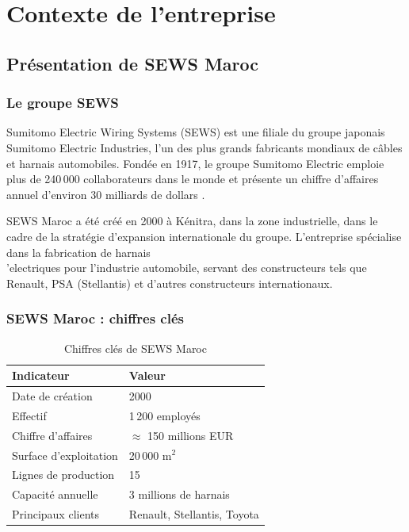 \chapter{Contexte de l'entreprise}

\section{Pr\'esentation de SEWS Maroc}

\subsection{Le groupe SEWS}

Sumitomo Electric Wiring Systems (SEWS) est une filiale du groupe japonais Sumitomo Electric Industries, l'un des plus grands fabricants mondiaux de c\^ables et harnais automobiles. Fond\'ee en 1917, le groupe Sumitomo Electric emploie plus de 240\,000 collaborateurs dans le monde et pr\'esente un chiffre d'affaires annuel d'environ 30 milliards de dollars \cite{sews2024}.

SEWS Maroc a \'et\'e cr\'e\'e en 2000 \`a K\'enitra, dans la zone industrielle, dans le cadre de la strat\'egie d'expansion internationale du groupe. L'entreprise sp\'ecialise dans la fabrication de harnais \\'electriques pour l'industrie automobile, servant des constructeurs tels que Renault, PSA (Stellantis) et d'autres constructeurs internationaux.

\subsection{SEWS Maroc : chiffres cl\'es}

\begin{table}[htbp]
\centering
\renewcommand{\arraystretch}{1.3}
\begin{tabular}{l l}
\toprule
\textbf{Indicateur} & \textbf{Valeur} \\
\midrule
Date de cr\'eation & 2000 \\
Effectif & 1\,200 employ\'es \\
Chiffre d'affaires & $\approx$ 150 millions EUR \\
Surface d'exploitation & 20\,000 m$^2$ \\
Lignes de production & 15 \\
Capacit\'e annuelle & 3 millions de harnais \\
Principaux clients & Renault, Stellantis, Toyota \\
\bottomrule
\end{tabular}
\caption{Chiffres cl\'es de SEWS Maroc}
\label{tab:sews_chiffres}
\end{table}

